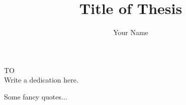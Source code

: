 \documentclass[12pt]{iiscthes}
\begin{document}
\begin{frontmatter}
%
%

\title{Title of Thesis}
\author{Your Name}
\enggfaculty
\iisclogotrue %
\tablespagetrue %
 \maketitle

\begin{dedication}
\begin{center}
TO \\[2em]
\large Write a dedication here.
\end{center}
\end{dedication}


%  
\clearpage
\vspace*{\fill}
\begin{center}
\begin{minipage}{.6\textwidth}
Some fancy quotes...
\medskip


\end{minipage}
\end{center}
\end{frontmatter}
\end{document}
